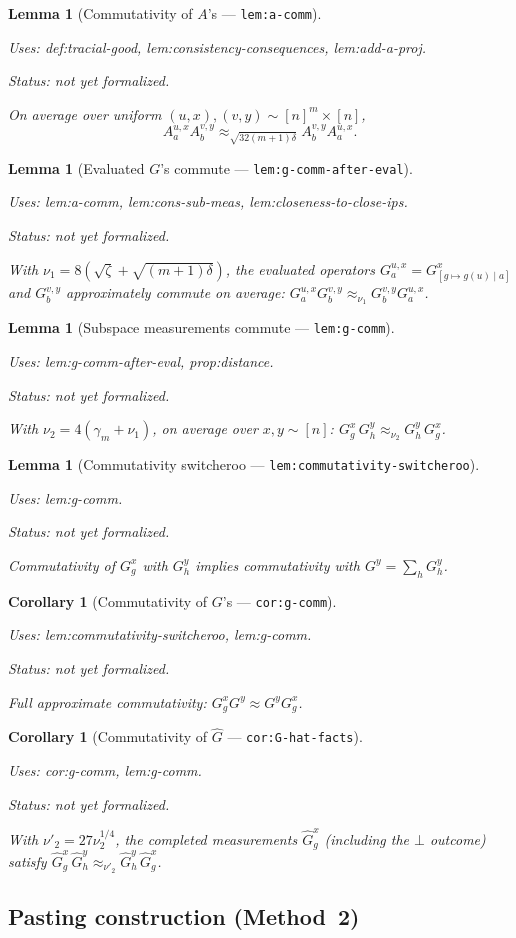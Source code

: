 \documentclass{article}
\providecommand{\uses}[1]{\par\smallskip\noindent\emph{Uses:} #1.\par\smallskip}
\providecommand{\notready}{\par\smallskip\noindent\emph{Status: not yet formalized.}\par\smallskip}
\newtheorem{lemma}[definition]{Lemma}
\newtheorem{corollary}[definition]{Corollary}
\theoremstyle{remark}
\begin{document}
\begin{lemma}[Commutativity of $A$'s --- \texttt{lem:a-comm}]
	\label{lem:a-comm}
	\uses{def:tracial-good, lem:consistency-consequences, lem:add-a-proj}
	\notready
	On average over uniform $(u,x),(v,y)\sim[n]^m\times[n]$,
	\[
		A^{u,x}_a A^{v,y}_b\approx_{\sqrt{32(m+1)\delta}} A^{v,y}_b A^{u,x}_a.
	\]
\end{lemma}

\begin{lemma}[Evaluated $G$'s commute --- \texttt{lem:g-comm-after-eval}]
	\label{lem:g-comm-after-eval}
	\uses{lem:a-comm, lem:cons-sub-meas, lem:closeness-to-close-ips}
	\notready
	With $\nu_1=8(\sqrt\zeta+\sqrt{(m+1)\delta})$,
	the evaluated operators $G^{u,x}_a=G^x_{[g\mapsto g(u)\mid a]}$ and
	$G^{v,y}_b$ approximately commute on average:
	$G^{u,x}_a G^{v,y}_b\approx_{\nu_1} G^{v,y}_b G^{u,x}_a$.
\end{lemma}

\begin{lemma}[Subspace measurements commute --- \texttt{lem:g-comm}]
	\label{lem:g-comm}
	\uses{lem:g-comm-after-eval, prop:distance}
	\notready
	With $\nu_2=4(\gamma_m+\nu_1)$, on average over $x,y\sim[n]$:
	$G^x_g\,G^y_h\approx_{\nu_2}G^y_h\,G^x_g$.
\end{lemma}

\begin{lemma}[Commutativity switcheroo --- \texttt{lem:commutativity-switcheroo}]
	\label{lem:commutativity-switcheroo}
	\uses{lem:g-comm}
	\notready
	Commutativity of $G^x_g$ with $G^y_h$ implies commutativity with $G^y=\sum_h G^y_h$.
\end{lemma}

\begin{corollary}[Commutativity of $G$'s --- \texttt{cor:g-comm}]
	\label{cor:g-comm}
	\uses{lem:commutativity-switcheroo, lem:g-comm}
	\notready
	Full approximate commutativity: $G^x_g G^y\approx G^y G^x_g$.
\end{corollary}

\begin{corollary}[Commutativity of $\widehat{G}$ --- \texttt{cor:G-hat-facts}]
	\label{cor:G-hat-facts}
	\uses{cor:g-comm, lem:g-comm}
	\notready
	With $\nu'_2=27\nu_2^{1/4}$, the completed measurements
	$\widehat{G}^x_g$ (including the $\bot$ outcome) satisfy
	$\widehat{G}^x_g\,\widehat{G}^y_h\approx_{\nu'_2}\widehat{G}^y_h\,\widehat{G}^x_g$.
\end{corollary}

\subsection{Pasting construction (Method~2)}
\end{document}
